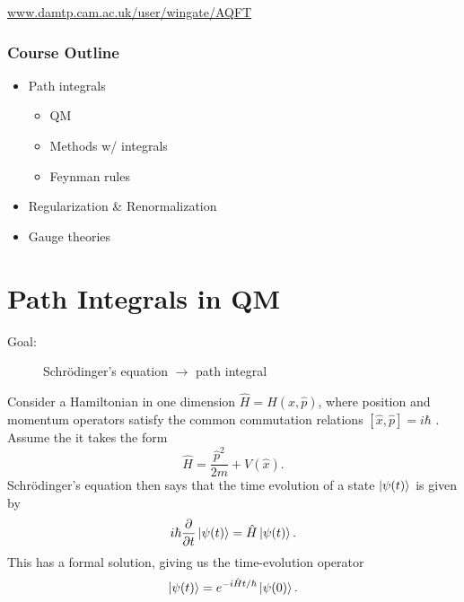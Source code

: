 
\url{www.damtp.cam.ac.uk/user/wingate/AQFT}

\subsection*{Course Outline}%

\begin{itemize}
  \item Path integrals
    \begin{itemize}
      \item QM
      \item Methods w/ integrals
      \item Feynman rules
    \end{itemize}
  \item Regularization \& Renormalization
  \item Gauge theories
\end{itemize}

\chapter{Path Integrals in QM}%
\label{cha:path_integrals_in_qm}

\begin{description}
  \item[Goal:] Schr\"odinger's equation $\to$ path integral
\end{description}

Consider a Hamiltonian in one dimension $\hat{H} = H(\hat{x}, \hat{p})$, where position and momentum operators satisfy the common commutation relations $[\hat{x}, \hat{p}] = i \hbar$ .
Assume the it takes the form
\begin{equation}
  \hat{H} = \frac{\hat{p}^2}{2m} + V(\hat{x}).
\end{equation}
Schr\"odinger's equation then says that the time evolution of a state $\ket{\psi(t)}$  is given by
\begin{equation}
  i\hbar \frac{\partial }{\partial t} \ket{\psi(t)} = \hat{H} \ket{\psi(t)}.
\end{equation}
This has a formal solution, giving us the time-evolution operator
\begin{equation}
  \ket{\psi(t)} = e^{-i \hat{H} t / \hbar} \ket{\psi(0)}.
\end{equation}

